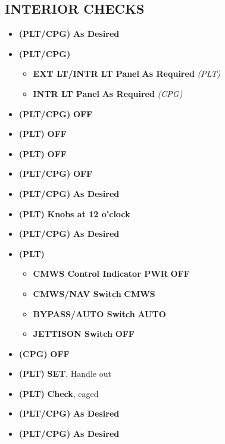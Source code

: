 \documentclass[fontInter]{TechCheck}
\begin{document}
	\subsection{INTERIOR CHECKS}
	\begin{itemize}[leftmargin=0.1\linewidth,rightmargin=0.1\linewidth, itemsep=4pt]
		\item {} \textbf{(PLT/CPG)} \dotfill \textbf{As Desired}
		\item {} \textbf{(PLT/CPG)} 
		\begin{itemize}[itemsep=4pt]
			\item \textbf{EXT LT/INTR LT Panel} \dotfill \textbf{As Required}
			\emph{(PLT)}
			\item \textbf{INTR LT Panel} \dotfill \textbf{As Required}
			\emph{(CPG)}
		\end{itemize}
		\item {} \textbf{(PLT/CPG)} \dotfill \textbf{OFF}
		\item {} \textbf{(PLT)} \dotfill \textbf{OFF}
		\item {} \textbf{(PLT)} \dotfill \textbf{OFF}
		\item {} \textbf{(PLT/CPG)} \dotfill \textbf{OFF}
		\item {} \textbf{(PLT/CPG)} \dotfill \textbf{As Desired}
		\item {} \textbf{(PLT)} \dotfill \textbf{Knobs at 12 o'clock}
		\item {} \textbf{(PLT/CPG)} \dotfill \textbf{As Desired}
		\item {} \textbf{(PLT)}
		\begin{itemize}[itemsep=4pt]
				\item \textbf{CMWS Control Indicator PWR} \dotfill \textbf{OFF}
				\item \textbf{CMWS/NAV Switch} \dotfill \textbf{CMWS}
				\item \textbf{BYPASS/AUTO Switch} \dotfill \textbf{AUTO}
				\item \textbf{JETTISON Switch} \dotfill \textbf{OFF}
		\end{itemize}
		\item {} \textbf{(CPG)} \dotfill \textbf{OFF}
		\item {} \textbf{(PLT)} \dotfill \textbf{SET}, Handle out
		\item {} \textbf{(PLT)} \dotfill \textbf{Check}, caged
		\item {} \textbf{(PLT/CPG)} \dotfill \textbf{As Desired}
		\item {} \textbf{(PLT/CPG)} \dotfill \textbf{As Desired} \\
	\end{itemize}
\end{document}
